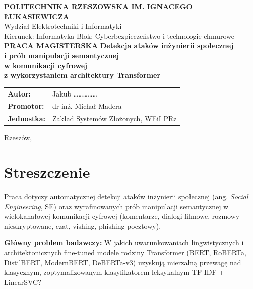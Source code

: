 \documentclass[12pt,a4paper,twoside]{report}
\begin{document}
\begin{titlepage}\centering
{\large\bfseries POLITECHNIKA RZESZOWSKA IM. IGNACEGO ŁUKASIEWICZA}\\[0.4em]
{\large Wydział Elektrotechniki i Informatyki}\\[0.3em]
{\normalsize Kierunek: Informatyka \quad Blok: Cyberbezpieczeństwo i technologie chmurowe}
\vspace{2.2cm}
{\LARGE\bfseries PRACA MAGISTERSKA}
\vspace{1.2cm}
{\Large\bfseries Detekcja ataków inżynierii społecznej\\i prób manipulacji semantycznej\\
w komunikacji cyfrowej\\z wykorzystaniem architektury Transformer}
\vspace{2cm}
\begin{tabular}{ll}
\textbf{Autor:} & Jakub \ldots\ldots\ldots\ldots\ldots \\[0.4em]
\textbf{Promotor:} & dr inż. Michał Madera \\[0.4em]
\textbf{Jednostka:} & Zakład Systemów Złożonych, WEiI PRz \\
\end{tabular}
\vfill
{\normalsize Rzeszów, \the\year}
\end{titlepage}

\tableofcontents\listoffigures\listoftables\newpage

\chapter*{Streszczenie}
Praca dotyczy automatycznej detekcji ataków inżynierii społecznej (ang. \emph{Social Engineering}, SE)
oraz wyrafinowanych prób manipulacji semantycznej w wielokanałowej komunikacji cyfrowej (komentarze, dialogi filmowe, rozmowy nieskryptowane, czat, vishing, phishing pocztowy).

\textbf{Główny problem badawczy:} W jakich uwarunkowaniach lingwistycznych i architektonicznych fine-tuned modele rodziny Transformer (BERT, RoBERTa, DistilBERT, ModernBERT, DeBERTa-v3) uzyskują mierzalną przewagę nad klasycznym, zoptymalizowanym klasyfikatorem leksykalnym TF-IDF + LinearSVC?
 
\end{document}
